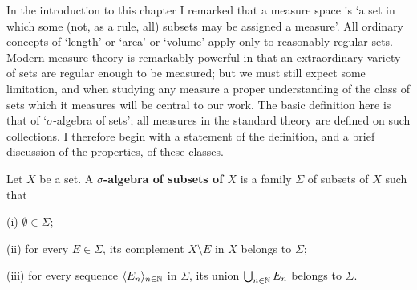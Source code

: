 
\def\chaptername{Measure spaces}
\def\sectionname{$\sigma$-algebras}


In the introduction to this chapter I remarked that a measure space is
`a set in which some (not, as a rule, all) subsets may be assigned a
measure'.   All ordinary concepts of `length' or `area' or `volume'
apply only to reasonably regular sets.   Modern measure theory
is remarkably powerful in that an extraordinary variety of sets are
regular enough to be measured;  but we must still expect some
limitation, and when studying any measure a proper understanding of the
class of sets which it measures will be central to our work.   The basic
definition here is that of `$\sigma$-algebra of sets';  all measures
in the standard theory are defined on such collections.   I
therefore begin with a statement of the definition, and a brief
discussion of the properties, of these classes.


 Let $X$ be a set.   A {\bf $\sigma$-algebra of
subsets of $X$} is a
family $\Sigma$ of subsets of $X$ such that

\qquad(i) $\emptyset\in\Sigma$;

\qquad(ii) for every $E\in\Sigma$, its complement $X\setminus E$ in $X$
belongs to $\Sigma$;

\qquad(iii) for every sequence $\langle E_n\rangle_{n\in\Bbb N}$ in
$\Sigma$, its union $\bigcup_{n\in\Bbb N}E_n$ belongs to $\Sigma$.


